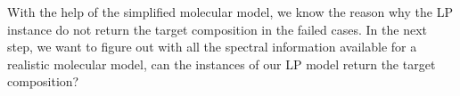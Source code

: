 With the help of the simplified molecular model, we know the reason why the LP instance do not return the target composition in the failed cases. In the next step, we want to figure out with all the spectral information available for a realistic molecular model, can the instances of our LP model return the target composition?



		

		 



